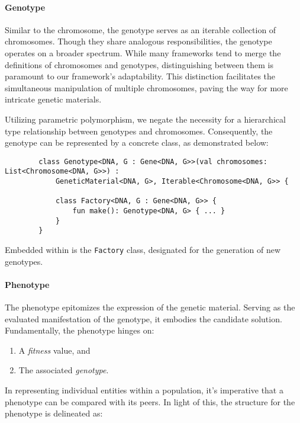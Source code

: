     \paragraph{Genotype}
      Similar to the chromosome, the genotype serves as an iterable collection 
      of chromosomes.
      Though they share analogous responsibilities, the genotype operates on a 
      broader spectrum.
      While many frameworks tend to merge the definitions of chromosomes and 
      genotypes, distinguishing between them is paramount to our framework's 
      adaptability.
      This distinction facilitates the simultaneous manipulation of multiple 
      chromosomes, paving the way for more intricate genetic materials.
      
      Utilizing parametric polymorphism, we negate the necessity for a 
      hierarchical type relationship between genotypes and chromosomes.
      Consequently, the genotype can be represented by a concrete class, as 
      demonstrated below:
      
      \begin{verbatim}
        class Genotype<DNA, G : Gene<DNA, G>>(val chromosomes: List<Chromosome<DNA, G>>) :
            GeneticMaterial<DNA, G>, Iterable<Chromosome<DNA, G>> {
      
            class Factory<DNA, G : Gene<DNA, G>> {
                fun make(): Genotype<DNA, G> { ... }
            }
        }
      \end{verbatim}
      
      Embedded within is the \texttt{Factory} class, designated for the 
      generation of new genotypes.

    \paragraph{Phenotype}
      The phenotype epitomizes the expression of the genetic material.
      Serving as the evaluated manifestation of the genotype, it embodies the 
      candidate solution.
      Fundamentally, the phenotype hinges on:
      \begin{enumerate}
          \item A \textit{fitness} value, and
          \item The associated \textit{genotype}.
      \end{enumerate}
      
      In representing individual entities within a population, it's imperative 
      that a phenotype can be compared with its peers. 
      In light of this, the structure for the phenotype is delineated as:
      
